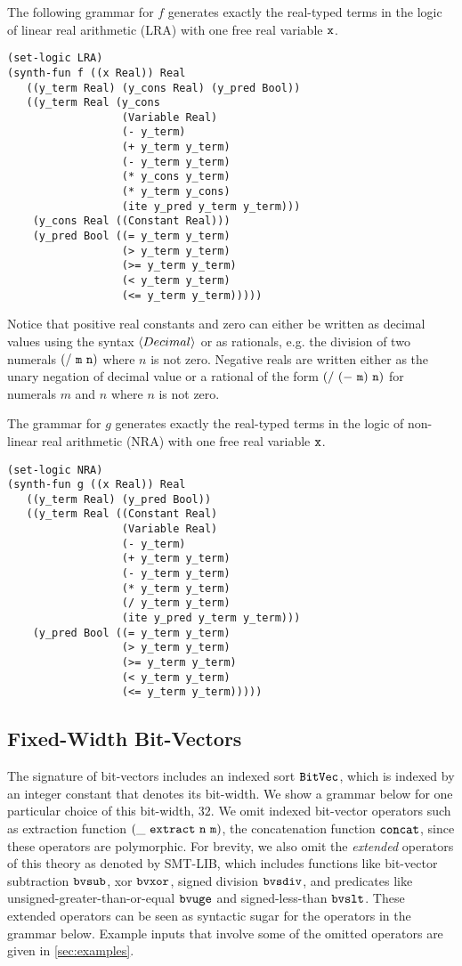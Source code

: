 \documentclass[english,a4paper,10pt]{article}
\begin{document}
\begin{appendix}
The following grammar for $f$
generates exactly the real-typed terms in the logic of
linear real arithmetic (LRA)
with one free real variable ${\tt x}$.
\begin{lstlisting}[basicstyle={\ttfamily}]
(set-logic LRA)
(synth-fun f ((x Real)) Real
   ((y_term Real) (y_cons Real) (y_pred Bool))
   ((y_term Real (y_cons 
                  (Variable Real) 
                  (- y_term)
                  (+ y_term y_term)
                  (- y_term y_term)
                  (* y_cons y_term)
                  (* y_term y_cons)
                  (ite y_pred y_term y_term)))
    (y_cons Real ((Constant Real)))
    (y_pred Bool ((= y_term y_term)
                  (> y_term y_term)
                  (>= y_term y_term)
                  (< y_term y_term)
                  (<= y_term y_term)))))
\end{lstlisting}
Notice that positive real constants and zero can either be written 
as decimal values using the syntax $\left\langle Decimal\right\rangle$
or as rationals, e.g. the division of two numerals
${\tt (/\ m\ n)}$ where $n$ is not zero.
Negative reals are written either as the unary negation of decimal value 
or a rational of the form ${\tt (/\ (-\ m)\ n)}$ for numerals $m$ and $n$
where $n$ is not zero.

The grammar for $g$
generates exactly the real-typed terms in the logic of
non-linear real arithmetic (NRA)
with one free real variable ${\tt x}$.
\begin{lstlisting}[basicstyle={\ttfamily}]
(set-logic NRA)
(synth-fun g ((x Real)) Real
   ((y_term Real) (y_pred Bool))
   ((y_term Real ((Constant Real) 
                  (Variable Real)
                  (- y_term)
                  (+ y_term y_term)
                  (- y_term y_term)
                  (* y_term y_term)
                  (/ y_term y_term)
                  (ite y_pred y_term y_term)))
    (y_pred Bool ((= y_term y_term)
                  (> y_term y_term)
                  (>= y_term y_term)
                  (< y_term y_term)
                  (<= y_term y_term)))))
\end{lstlisting}

\subsection{Fixed-Width Bit-Vectors}

The signature of bit-vectors includes an indexed sort
${\tt BitVec}$, which is indexed by an integer constant that denotes
its bit-width. We show a grammar below for one particular
choice of this bit-width, $32$.
We omit indexed bit-vector operators
such as extraction function ${\tt (\_\ extract\ n\ m)}$, 
the concatenation function ${\tt concat}$,
since these operators are polymorphic.
For brevity,
we also omit the \emph{extended} operators of this theory
as denoted by SMT-LIB,
which includes functions like
bit-vector subtraction ${\tt bvsub}$,
xor ${\tt bvxor}$,
signed division ${\tt bvsdiv}$,
and predicates like
unsigned-greater-than-or-equal ${\tt bvuge}$
and signed-less-than ${\tt bvslt}$.
These extended operators can be seen as syntactic sugar for the
operators in the grammar below.
Example inputs that involve 
some of the omitted operators are given in \cref{sec:examples}.


\end{appendix}
\end{document}
